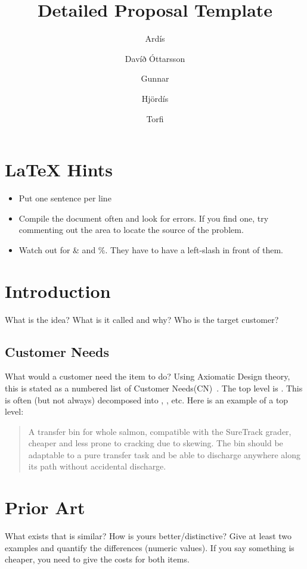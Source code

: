 \documentclass[draft]{rureport}
\author{
  Ardís\formatemail{ardis@ru.is}
  \and
  Davíð Óttarsson\formatemail{davido22@ru.is}
  \and 
  Gunnar\formatemail{gunnar@ru.is}
  \and
  Hjördís\formatemail{hjördís@ru.is}
  \and
  Torfi\formatemail{torfi@ru.is}
}
\title{Detailed Proposal Template}  %
\begin{document}
\maketitle  %
\listoffixmes{}

\section*{\LaTeX{} Hints}
\begin{itemize}
\item Put one sentence per line
\item Compile the document often and look for errors.
  If you find one, try commenting out the area to locate the source of the problem.
\item Watch out for \& and \%.  They have to have a left-slash in front of them.
\end{itemize}

\section{Introduction}
What is the idea?  What is it called and why?
Who is the target customer?

\subsection{Customer Needs}
What would a customer need the item to do?  
Using Axiomatic Design theory, this is stated as a numbered list of Customer Needs(CN)~\cite{suh1990principles}.
The top level is .
This is often (but not always) decomposed into , , etc.
Here is an example of a top level:

\begin{quote} \textbf{} A transfer bin for whole salmon, compatible with the SureTrack grader, cheaper and less prone to cracking due to skewing.  
The bin should be adaptable to a pure transfer task and be able to discharge anywhere along its path without
accidental discharge.~\cite{gerhard2016suretrack}
\end{quote}


\section{Prior Art}
What exists that is similar?  How is yours better/distinctive?
Give at least two examples and quantify the differences (numeric values).
If you say something is cheaper, you need to give the costs for both items.
\end{document}
